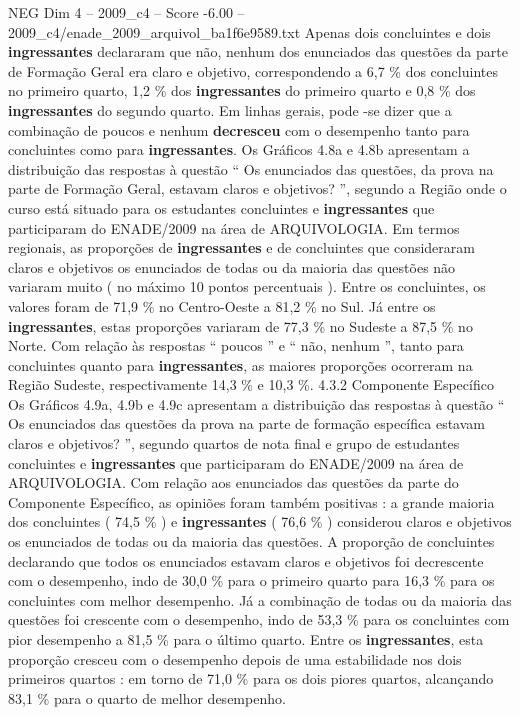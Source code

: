 \begin{textsample}{NEG Dim 4 – 2009\_c4 – Score -6.00 – 2009\_c4/enade\_2009\_arquivol\_ba1f6e9589.txt}
Apenas dois concluintes e dois \textbf{ingressantes} declararam que não, nenhum dos enunciados das questões da parte de Formação Geral era claro e objetivo, correspondendo a 6,7 \% dos concluintes no primeiro quarto, 1,2 \% dos \textbf{ingressantes} do primeiro quarto e 0,8 \% dos \textbf{ingressantes} do segundo quarto.
Em linhas gerais, pode -se dizer que a combinação de poucos e nenhum \textbf{decresceu} com o desempenho tanto para concluintes como para \textbf{ingressantes}.
Os Gráficos 4.8a e 4.8b apresentam a distribuição das respostas à questão “ Os enunciados das questões, da prova na parte de Formação Geral, estavam claros e objetivos? ”, segundo a Região onde o curso está situado para os estudantes concluintes e \textbf{ingressantes} que participaram do ENADE/2009 na área de ARQUIVOLOGIA.
Em termos regionais, as proporções de \textbf{ingressantes} e de concluintes que consideraram claros e objetivos os enunciados de todas ou da maioria das questões não variaram muito ( no máximo 10 pontos percentuais ).
Entre os concluintes, os valores foram de 71,9 \% no Centro-Oeste a 81,2 \% no Sul.
Já entre os \textbf{ingressantes}, estas proporções variaram de 77,3 \% no Sudeste a 87,5 \% no Norte.
Com relação às respostas “ poucos ” e “ não, nenhum ”, tanto para concluintes quanto para \textbf{ingressantes}, as maiores proporções ocorreram na Região Sudeste, respectivamente 14,3 \% e 10,3 \%. 4.3.2 Componente Específico Os Gráficos 4.9a, 4.9b e 4.9c apresentam a distribuição das respostas à questão “ Os enunciados das questões da prova na parte de formação específica estavam claros e objetivos? ”, segundo quartos de nota final e grupo de estudantes concluintes e \textbf{ingressantes} que participaram do ENADE/2009 na área de ARQUIVOLOGIA.
Com relação aos enunciados das questões da parte do Componente Específico, as opiniões foram também positivas : a grande maioria dos concluintes ( 74,5 \% ) e \textbf{ingressantes} ( 76,6 \% ) considerou claros e objetivos os enunciados de todas ou da maioria das questões.
A proporção de concluintes declarando que todos os enunciados estavam claros e objetivos foi decrescente com o desempenho, indo de 30,0 \% para o primeiro quarto para 16,3 \% para os concluintes com melhor desempenho.
Já a combinação de todas ou da maioria das questões foi crescente com o desempenho, indo de 53,3 \% para os concluintes com pior desempenho a 81,5 \% para o último quarto.
Entre os \textbf{ingressantes}, esta proporção cresceu com o desempenho depois de uma estabilidade nos dois primeiros quartos : em torno de 71,0 \% para os dois piores quartos, alcançando 83,1 \% para o quarto de melhor desempenho.

\end{textsample}
